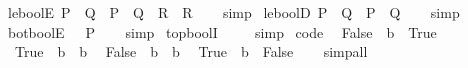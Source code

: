 \begin{isabellebody}
\ le{\isacharunderscore}{\kern0pt}boolE{\isacharcolon}{\kern0pt}\ {\isachardoublequoteopen}P\ {\isasymle}\ Q\ {\isasymLongrightarrow}\ P\ {\isasymLongrightarrow}\ {\isacharparenleft}{\kern0pt}Q\ {\isasymLongrightarrow}\ R{\isacharparenright}{\kern0pt}\ {\isasymLongrightarrow}\ R{\isachardoublequoteclose}\isanewline
%
\isadelimproof
\ \ %
\endisadelimproof
%
\isatagproof
{}\isamarkupfalse%
\ simp%
\endisatagproof
{\isafoldproof}%
%
\isadelimproof
\isanewline
%
\endisadelimproof
\isanewline
{}\isamarkupfalse%
\ le{\isacharunderscore}{\kern0pt}boolD{\isacharcolon}{\kern0pt}\ {\isachardoublequoteopen}P\ {\isasymle}\ Q\ {\isasymLongrightarrow}\ P\ {\isasymlongrightarrow}\ Q{\isachardoublequoteclose}\isanewline
%
\isadelimproof
\ \ %
\endisadelimproof
%
\isatagproof
{}\isamarkupfalse%
\ simp%
\endisatagproof
{\isafoldproof}%
%
\isadelimproof
\isanewline
%
\endisadelimproof
\isanewline
{}\isamarkupfalse%
\ bot{\isacharunderscore}{\kern0pt}boolE{\isacharcolon}{\kern0pt}\ {\isachardoublequoteopen}{\isasymbottom}\ {\isasymLongrightarrow}\ P{\isachardoublequoteclose}\isanewline
%
\isadelimproof
\ \ %
\endisadelimproof
%
\isatagproof
{}\isamarkupfalse%
\ simp%
\endisatagproof
{\isafoldproof}%
%
\isadelimproof
\isanewline
%
\endisadelimproof
\isanewline
{}\isamarkupfalse%
\ top{\isacharunderscore}{\kern0pt}boolI{\isacharcolon}{\kern0pt}\ {\isasymtop}\isanewline
%
\isadelimproof
\ \ %
\endisadelimproof
%
\isatagproof
{}\isamarkupfalse%
\ simp%
\endisatagproof
{\isafoldproof}%
%
\isadelimproof
\isanewline
%
\endisadelimproof
\isanewline
{}\isamarkupfalse%
\ {\isacharbrackleft}{\kern0pt}code{\isacharbrackright}{\kern0pt}{\isacharcolon}{\kern0pt}\isanewline
\ \ {\isachardoublequoteopen}False\ {\isasymle}\ b\ {\isasymlongleftrightarrow}\ True{\isachardoublequoteclose}\isanewline
\ \ {\isachardoublequoteopen}True\ {\isasymle}\ b\ {\isasymlongleftrightarrow}\ b{\isachardoublequoteclose}\isanewline
\ \ {\isachardoublequoteopen}False\ {\isacharless}{\kern0pt}\ b\ {\isasymlongleftrightarrow}\ b{\isachardoublequoteclose}\isanewline
\ \ {\isachardoublequoteopen}True\ {\isacharless}{\kern0pt}\ b\ {\isasymlongleftrightarrow}\ False{\isachardoublequoteclose}\isanewline
%
\isadelimproof
\ \ %
\endisadelimproof
%
\isatagproof
{}\isamarkupfalse%
\ simp{\isacharunderscore}{\kern0pt}all%
\endisatagproof
{\isafoldproof}%
%
\isadelimproof
%
\endisadelimproof
%
\isadelimdocument
%
\endisadelimdocument
%
\isatagdocument
%
\end{isabellebody}
